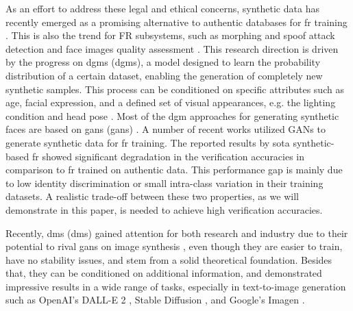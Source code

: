 \documentclass[10pt,twocolumn,letterpaper]{article}
\begin{document}
As an effort to address these legal and ethical concerns, synthetic data has recently emerged as a promising alternative to authentic databases for \acrshort{fr} training \cite{Qiu2021, Boutros2022SFace, FBoutros2022USynthFace, IVC_Syn, DigiFace1M, QuantFace}. 
This is also the trend for FR subsystems, such as morphing and spoof attack detection \cite{DBLP:conf/cvpr/DamerLFSPB22,DBLP:conf/cvpr/FANG23} and face images quality assessment \cite{DBLP:journals/corr/abs-2305-05768}.
This research direction is driven by the progress on \acrlong{dgm}s (\acrshort{dgm}s), a model designed to learn the probability distribution of a certain dataset, enabling the generation of completely new synthetic samples. 
This process can be conditioned on specific attributes such as age, facial expression, and a defined set of visual appearances, e.g. the lighting condition and head pose \cite{Deng2020, Shoshan2021, Tewari2020, Ghosh2020}. 
Most of the \acrshort{dgm} approaches for generating synthetic faces are based on \acrlong{gan}s (\acrshort{gan}s) \cite{Goodfellow2014, Deng2020, Shen2020, IDnet, Boutros2022SFace}. A number of recent works \cite{Marriott2020, FBoutros2022USynthFace, Qiu2021} utilized GANs \cite{Deng2020,Karras2020StyleGANADA} to generate synthetic data for \acrshort{fr} training. The reported results by \acrshort{sota} synthetic-based \acrshort{fr} showed significant degradation in the verification accuracies in comparison to \acrshort{fr} trained on authentic data. This performance gap is mainly due to low identity discrimination \cite{Boutros2022SFace} or small intra-class variation \cite{FBoutros2022USynthFace,Qiu2021} in their training datasets. A realistic trade-off between these two properties, as we will demonstrate in this paper, is needed to achieve high verification accuracies. 


Recently, \acrlong{dm}s (\acrshort{dm}s) \cite{Ho2020, Nichol2021, Rombach2021, Dhariwal2021} gained attention for both research and industry due to their potential to rival \acrshort{gan}s on image synthesis \cite{Dhariwal2021}, even though they are easier to train, have no stability issues, and stem from a solid theoretical foundation. Besides that, they can be conditioned on additional information, and demonstrated impressive results in a wide range of tasks, especially in text-to-image generation such as 
OpenAI's DALL-E 2 \cite{Ramesh2022}, Stable Diffusion \cite{Rombach2021}, and Google's Imagen \cite{Saharia2022}. 
\end{document}
